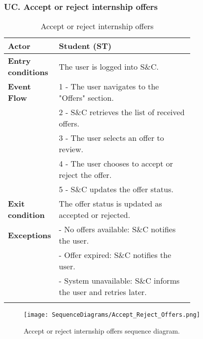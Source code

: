 \subsubsection*{UC\cuc . Accept or reject internship offers}
\begin{center}
    \begin{longtable}{|l|p{0.75\linewidth}|}
        \hline
        \textbf{Actor}            & Student (ST) \\
        \hline
        \textbf{Entry conditions} & The user is logged into S\&C. \\
        \hline
        \textbf{Event Flow}       & 1 - The user navigates to the "Offers" section. \\
        & 2 - S\&C retrieves the list of received offers. \\
        & 3 - The user selects an offer to review. \\
        & 4 - The user chooses to accept or reject the offer. \\
        & 5 - S\&C updates the offer status. \\
        \hline
        \textbf{Exit condition}   & The offer status is updated as accepted or rejected. \\       
        \hline
        \textbf{Exceptions}       & - No offers available: S\&C notifies the user. \\
                                  & - Offer expired: S\&C notifies the user. \\
                                  & - System unavailable: S\&C informs the user and retries later. \\
        \hline
        \caption{Accept or reject internship offers}
        \label{tab:accept_reject_offers_usecase}
    \end{longtable}
\end{center}

\begin{figure}[H]
    \begin{center}
        \texttt{[image: SequenceDiagrams/Accept\_Reject\_Offers.png]}
        \caption{Accept or reject internship offers sequence diagram.}
        \label{fig:accept_reject_offers_seqd}%
    \end{center}
\end{figure}

